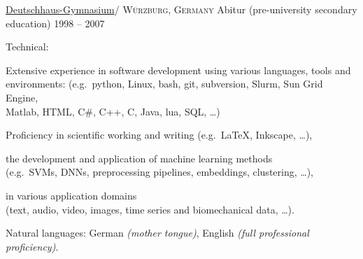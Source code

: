 \documentclass[10pt,a4paper]{article} %
\begin{document}

\headedsection %
{\href{https://www.deutschhaus.de/ }{Deutschhaus-Gymnasium}/\href{https://www.deutschhaus.de/ }{}}
{\textsc{W\"urzburg, Germany}}
{
\headedsubsection %
{Abitur \textnormal{(pre-university secondary education)}}
{1998 -- 2007}
 {}
}

\spacedhrule{0.5em}{-0.4em} %



\inlineheadsection %
{Technical:}
{Extensive experience in software development
using various languages, tools and environments:
(e.g.\ python, Linux, bash, git, subversion, Slurm, Sun Grid Engine,\\
Matlab, HTML, C\#, C++, C, Java, lua, SQL, \dots )

Proficiency in scientific working and writing (e.g.\ \LaTeX, Inkscape, \dots),

the development and application of machine learning methods\\
(e.g.\ SVMs, DNNs, preprocessing pipelines, embeddings, clustering, \dots),

in various application domains\\
(text, audio, video, images, time series and biomechanical data, \dots).
}


\vspace{.65em}
\inlineheadsection %
{Natural languages:}
{German \textit{(mother tongue)}, English \textit{(full professional proficiency)}.}


\spacedhrule{1.6em}{-0.4em} %

\end{document}
